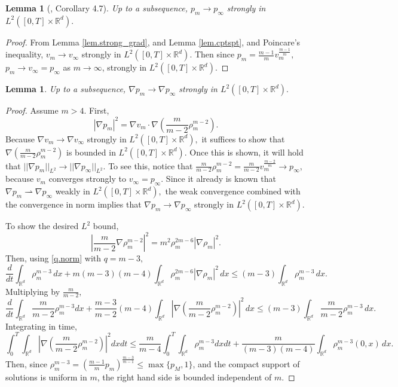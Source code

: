 \documentclass{amsart}
\newtheorem{lemma}[theorem]{Lemma}
\def\R{\mathbb R}
\begin{document}
\begin{lemma}[\cite{david}, Corollary 4.7]
    Up to a subsequence, $p_m \rightarrow p_\infty$ strongly in $L^2([0,T]\times \R^d).$
\end{lemma}
\begin{proof}
    From Lemma \ref{lem.strong_grad}, and Lemma \ref{lem.cptspt}, and Poincare's inequality, $v_m \rightarrow v_\infty$ strongly in $L^2([0,T]\times \R^d).$ Then since $p_m=\frac{m-1}{m}v_m^\frac{m-1}{m},$ $p_m \rightarrow v_\infty=p_\infty$ as $m \rightarrow \infty$, strongly in $L^2([0,T]\times \R^d)$.
\end{proof}
\begin{lemma}
     Up to a subsequence, $\nabla p_m \rightarrow \nabla p_\infty$ strongly in $L^2([0,T]\times \R^d).$
\end{lemma}
\begin{proof}
Assume $m>4$. First, $$|\nabla p_m|^2=\nabla v_m \cdot \nabla(\frac{m}{m-2}\rho_m^{m-2}).$$ Because $\nabla v_m\rightarrow \nabla v_\infty$ strongly in $L^2([0,T]\times\R^d),$ it suffices to show that $\nabla (\frac{m}{m-2}\rho_m^{m-2})$ is bounded in $L^2([0,T]\times \R^d).$ Once this is shown, it will hold that $||\nabla p_m||_{L^2} \rightarrow ||\nabla p_\infty||_{L^2}.$ To see this, notice that $\frac{m}{m-2}\rho_m^{m-2}=\frac{m}{m-2}v_m^{\frac{m-2}{m}} \rightarrow p_\infty$, because $v_m$ converges strongly to $v_\infty=p_\infty.$ Since it already is known that $\nabla p_m \rightharpoonup \nabla p_\infty$ weakly in $L^2([0,T]\times \R^d),$ the weak convergence combined with the convergence in norm implies that $\nabla p_m \rightarrow \nabla p_\infty$ strongly in $L^2([0,T]\times \R^d).$ 

To show the desired $L^2$ bound, $$
|\frac{m}{m-2}\nabla \rho_m^{m-2}|^2=m^2\rho_m^{2m-6}|\nabla \rho_m|^2.$$ Then, using \eqref{q.norm} with $q=m-3,$ $$
\frac{d}{dt}\int_{\R^d}\rho_m^{m-3}\,dx +m(m-3)(m-4)\int_{\R^d}\rho_m^{2m-6}|\nabla \rho_m|^2\, dx \leq (m-3)\int_{\R^d}\rho_m^{m-3}\,dx.$$ Multiplying by $\frac{m}{m-2},$ $$
\frac{d}{dt}\int_{\R^d}\frac{m}{m-2}\rho_m^{m-3}
dx+\frac{m-3}{m-2}(m-4)\int_{\R^d}|\nabla (\frac{m}{m-2}\rho_m^{m-2})|^2\,dx\leq (m-3)\int_{\R^d}\frac{m}{m-2}\rho_m^{m-3}\,dx.$$ Integrating in time,
\begin{equation*}
    \int_{0}^{T}\int_{\R^d}|\nabla (\frac{m}{m-2}\rho_m^{m-2})|^2dxdt \leq \frac{m}{m-4}\int_0^T\int_{\R^d}\rho_m^{m-3}dxdt+\frac{m}{(m-3)(m-4)}\int_{\R^d}\rho_m^{m-3}(0,x)\,dx.
\end{equation*}
Then, since $\rho_m^{m-3}=(\frac{m-1}{m}p_m)^{\frac{m-3}{m-1}} \leq \max\{p_M,1\}$, and the compact support of solutions is uniform in $m$, the right hand side is bounded independent of $m$.
\end{proof}
\end{document}
